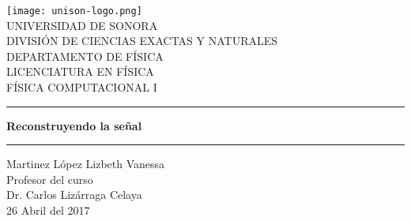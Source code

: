 \documentclass[12pt]{article}
\begin{document}
\begin{center}
\texttt{[image: unison-logo.png]}
\\
\vspace{0.5cm}
UNIVERSIDAD DE SONORA \\
\vspace{0.5cm}
DIVISIÓN DE CIENCIAS EXACTAS Y NATURALES \\
\vspace{0.5cm}
DEPARTAMENTO DE FÍSICA\\
\vspace{0.5cm}
LICENCIATURA EN FÍSICA\\
\vspace{0.5cm}
FÍSICA COMPUTACIONAL I

\vspace{2 cm}
\hrule
\vspace{1 cm}

{\huge \bfseries {Reconstruyendo la señal}}

\vspace{1 cm}
\hrule
\vspace{2 cm}
Martinez López Lizbeth Vanessa \\ 
\vspace{1 cm}
Profesor del curso\\
Dr. Carlos Lizárraga Celaya\\
\vspace{2 cm}
26 Abril del 2017
\end{center}
\pagebreak
\end{document}
